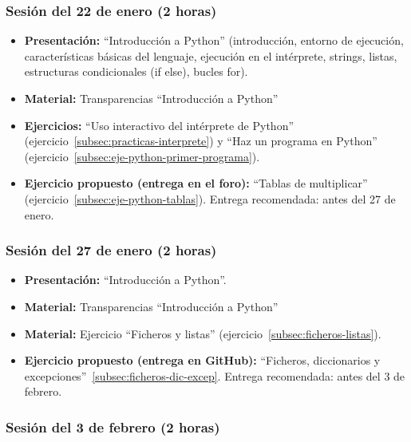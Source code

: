 \documentclass[a4paper,12pt]{article}
\begin{document}
\subsubsection{Sesión del 22 de enero (2 horas)}

\begin{itemize}
\item \textbf{Presentación:} ``Introducción a Python'' (introducción, entorno de ejecución, características básicas del lenguaje, ejecución en el intérprete, strings, listas, estructuras condicionales (if else), bucles for).
\item \textbf{Material:} Transparencias ``Introducción a Python''
\item \textbf{Ejercicios:} ``Uso interactivo del intérprete de Python'' (ejercicio~\ref{subsec:practicas-interprete}) y ``Haz un programa en Python'' (ejercicio~\ref{subsec:eje-python-primer-programa}).
\item \textbf{Ejercicio propuesto (entrega en el foro):} ``Tablas de multiplicar'' (ejercicio~\ref{subsec:eje-python-tablas}).
   Entrega recomendada: antes del 27 de enero.
\end{itemize}

\subsubsection{Sesión del 27 de enero (2 horas)}

\begin{itemize}
\item \textbf{Presentación:} ``Introducción a Python''.
\item \textbf{Material:} Transparencias ``Introducción a Python''
\item \textbf{Material:} Ejercicio ``Ficheros y listas'' (ejercicio~\ref{subsec:ficheros-listas}).
\item \textbf{Ejercicio propuesto (entrega en GitHub):} ``Ficheros, diccionarios y excepciones''~\ref{subsec:ficheros-dic-excep}.
   Entrega recomendada: antes del 3 de febrero.
\end{itemize}

\subsubsection{Sesión del 3 de febrero (2 horas)}
\end{document}
